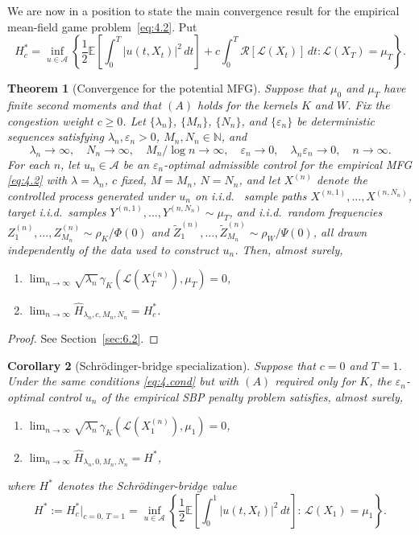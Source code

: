 \documentclass[11pt,leqno]{article}
\theoremstyle{plain}
\newtheorem{thm}{Theorem}[section]
\newtheorem{cor}[thm]{Corollary}
\theoremstyle{remark}
\theoremstyle{definition}
\numberwithin{equation}{section}
\numberwithin{figure}{section}
\numberwithin{table}{section}
\numberwithin{algorithm}{section}
\newcommand{\EE}{\mathbb{E}}
\begin{document}
We are now in a position to state the main convergence result for the empirical mean-field game problem~\eqref{eq:4.2}.
Put 
\[
H^*_c = \inf_{u\in\mathcal{A}}\left\{\frac{1}{2}\EE\left[\int_0^T|u(t,X_t)|^2\,dt\right]+c\int_0^T\mathcal{R}[\mathcal{L}(X_t)]\,dt:\mathcal{L}(X_T)=\mu_T\right\}.
\]
\begin{thm}[Convergence for the potential MFG]\label{thm:convergence}
Suppose that $\mu_0$ and $\mu_T$ have finite second moments and that $(A)$ holds
for the kernels $K$ and $W$.
Fix the congestion weight $c\ge 0$.
Let $\{\lambda_n\}$, $\{M_n\}$, $\{N_n\}$, and $\{\varepsilon_n\}$ be deterministic sequences
satisfying $\lambda_n,\varepsilon_n>0$, $M_n,N_n\in\mathbb{N}$, and
\begin{equation}\label{eq:4.cond}
 \lambda_n\to\infty,\quad N_n\to\infty,\quad M_n/\log n\to\infty,\quad
 \varepsilon_n\to 0,\quad \lambda_n\varepsilon_n\to 0, \quad n\to\infty.
\end{equation}
For each $n$, let $u_n\in\mathcal{A}$ be an $\varepsilon_n$-optimal admissible control for the empirical MFG \eqref{eq:4.2}
with $\lambda=\lambda_n$, $c$ fixed, $M=M_n$, $N=N_n$,
and let $X^{(n)}$ denote the controlled process generated under $u_n$ on
i.i.d.~ sample paths $X^{(n,1)},\ldots,X^{(n,N_n)}$, target i.i.d.\ samples $Y^{(n,1)},\ldots,Y^{(n,N_n)}\sim\mu_T$,
and i.i.d.\ random frequencies $Z^{(n)}_1,\ldots,Z^{(n)}_{M_n}\sim\rho_K/\Phi(0)$
and $\tilde Z^{(n)}_1,\ldots,\tilde Z^{(n)}_{M_n}\sim\rho_W/\Psi(0)$,
all drawn independently of the data used to construct $u_n$.
Then, almost surely,
\begin{enumerate}[label=\textup{(\roman*)}]
\item $\displaystyle \lim_{n\to\infty}\sqrt{\lambda_n}\,\gamma_K(\mathcal{L}(X_T^{(n)}),\mu_T)=0$,
\item $\displaystyle \lim_{n\to\infty}\hat H_{\lambda_n,c,M_n,N_n} = H^*_c$. 
\end{enumerate}
\end{thm}
\begin{proof}
See Section~\ref{sec:6.2}.
\end{proof}

\begin{cor}[Schr{\"o}dinger-bridge specialization]\label{cor:sbp_special_case}
Suppose that $c=0$ and $T=1$.
Under the same conditions \eqref{eq:4.cond} but with $(A)$ required only for $K$,
the $\varepsilon_n$-optimal control $u_n$ of the empirical SBP penalty problem satisfies, almost surely,
\begin{enumerate}[label=\textup{(\roman*)}]
\item $\displaystyle \lim_{n\to\infty}\sqrt{\lambda_n}\,\gamma_K(\mathcal{L}(X_1^{(n)}),\mu_1)=0$,
\item $\displaystyle \lim_{n\to\infty}\hat H_{\lambda_n,0,M_n,N_n} = H^*$,
\end{enumerate}
where $H^*$ denotes the Schr{\"o}dinger-bridge value
\[
 H^* := H^*_c\bigr|_{c=0,\,T=1}
 = \inf_{u\in\mathcal{A}}\left\{\frac{1}{2}\EE\!\left[\int_0^1|u(t,X_t)|^2\,dt\right]:\,\mathcal{L}(X_1)=\mu_1\right\}.
\]
\end{cor}
\end{document}
